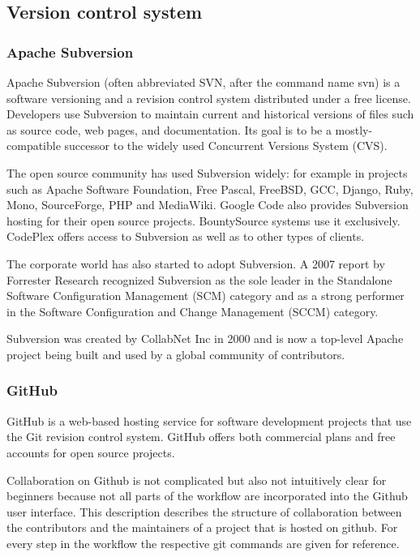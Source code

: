\subsection{Version control system}

\subsubsection{Apache Subversion}

Apache Subversion (often abbreviated SVN, after the command name svn) is a software versioning and a revision control system distributed under a free license. Developers use Subversion to maintain current and historical versions of files such as source code, web pages, and documentation. Its goal is to be a mostly-compatible successor to the widely used Concurrent Versions System (CVS).\newline

The open source community has used Subversion widely: for example in projects such as Apache Software Foundation, Free Pascal, FreeBSD, GCC, Django, Ruby, Mono, SourceForge, PHP and MediaWiki. Google Code also provides Subversion hosting for their open source projects. BountySource systems use it exclusively. CodePlex offers access to Subversion as well as to other types of clients.\newline

The corporate world has also started to adopt Subversion. A 2007 report by Forrester Research recognized Subversion as the sole leader in the Standalone Software Configuration Management (SCM) category and as a strong performer in the Software Configuration and Change Management (SCCM) category.\newline

Subversion was created by CollabNet Inc in 2000 and is now a top-level Apache project being built and used by a global community of contributors.

\subsubsection{GitHub}

GitHub is a web-based hosting service for software development projects that use the Git revision control system. GitHub offers both commercial plans and free accounts for open source projects.\newline

Collaboration on Github is not complicated but also not intuitively clear for beginners because not all parts of the workflow are incorporated into the Github user interface. This description describes the structure of collaboration between the contributors and the maintainers of a project that is hosted on github. For every step in the workflow the respective git commands are given for reference.\newline

